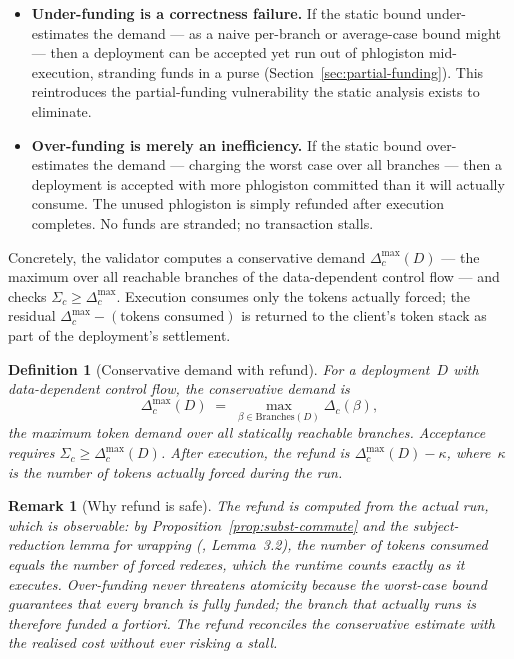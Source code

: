 \documentclass[11pt,a4paper]{article}
\newtheorem{definition}[theorem]{Definition}
\newtheorem{remark}[theorem]{Remark}
\begin{document}
\begin{itemize}[nosep]
  \item \textbf{Under-funding is a correctness failure.}  If
    the static bound under-estimates the demand --- as a
    naive per-branch or average-case bound might --- then a
    deployment can be accepted yet run out of phlogiston
    mid-execution, stranding funds in a purse
    (Section~\ref{sec:partial-funding}).  This reintroduces
    the partial-funding vulnerability the static analysis
    exists to eliminate.
  \item \textbf{Over-funding is merely an inefficiency.}  If
    the static bound over-estimates the demand --- charging
    the worst case over all branches --- then a deployment is
    accepted with more phlogiston committed than it will
    actually consume.  The unused phlogiston is simply
    refunded after execution completes.  No funds are
    stranded; no transaction stalls.
\end{itemize}

\noindent
Concretely, the validator computes a conservative demand
$\Delta_c^{\max}(D)$ --- the maximum over all reachable
branches of the data-dependent control flow --- and checks
$\Sigma_c \geq \Delta_c^{\max}$.  Execution consumes only the
tokens actually forced; the residual
$\Delta_c^{\max} - (\text{tokens consumed})$ is returned to
the client's token stack as part of the deployment's
settlement.

\begin{definition}[Conservative demand with refund]
  \label{def:conservative-demand}
  For a deployment~$D$ with data-dependent control flow, the
  \emph{conservative demand} is
  \[
    \Delta_c^{\max}(D)
    \;=\;
    \max_{\beta \in \mathrm{Branches}(D)} \Delta_c(\beta),
  \]
  the maximum token demand over all statically reachable
  branches.  Acceptance requires $\Sigma_c \geq
  \Delta_c^{\max}(D)$.  After execution, the refund is
  $\Delta_c^{\max}(D) - \kappa$, where~$\kappa$ is the number
  of tokens actually forced during the run.
\end{definition}

\begin{remark}[Why refund is safe]
  The refund is computed from the \emph{actual} run, which is
  observable: by Proposition~\ref{prop:subst-commute} and the
  subject-reduction lemma for wrapping
  (\cite{CostEndofunctor}, Lemma~3.2), the number of tokens
  consumed equals the number of forced redexes, which the
  runtime counts exactly as it executes.  Over-funding never
  threatens atomicity because the worst-case bound guarantees
  that \emph{every} branch is fully funded; the branch that
  actually runs is therefore funded a fortiori.  The refund
  reconciles the conservative estimate with the realised cost
  without ever risking a stall.
\end{remark}
\end{document}
